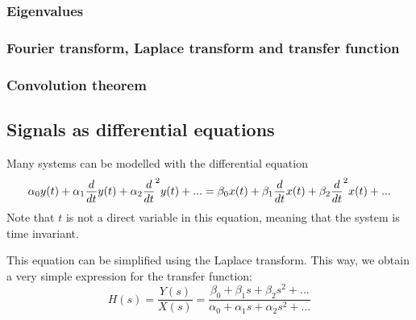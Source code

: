 
\subsubsection{Eigenvalues}

\subsubsection{Fourier transform, Laplace transform and transfer function}

\subsubsection{Convolution theorem}

\subsection{Signals as differential equations}
Many systems can be modelled with the differential equation
$$ \alpha_0 y(t) + \alpha_1  \frac{ \mathop{d} }{ \mathop{dt} }  y(t) + \alpha_2  \frac{ \mathop{d} }{ \mathop{dt} } ^2 y(t) + ... =   \beta_0 x(t) + \beta_1  \frac{ \mathop{d} }{ \mathop{dt} }  x(t) + \beta_2  \frac{ \mathop{d} }{ \mathop{dt} } ^2 x(t) + ...   $$
Note that $t$ is not a direct variable in this equation, meaning that the system is time invariant. 

This equation can be simplified using the Laplace transform. 
This way, we obtain a very simple expression for the transfer function:
$$ H(s) = \frac{Y(s)}{X(s)} = \frac{\beta_0 + \beta_1 s + \beta_2 s^2 + ...}{\alpha_0 + \alpha_1 s + \alpha_2 s^2 + ...}  $$

